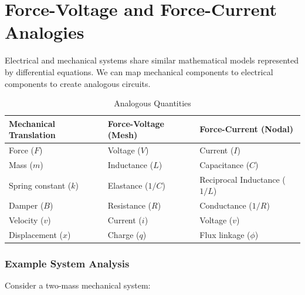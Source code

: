 \documentclass[12pt]{article}
\begin{document}
\section{Force-Voltage and Force-Current Analogies}
Electrical and mechanical systems share similar mathematical models represented by differential equations. We can map mechanical components to electrical components to create analogous circuits.

\begin{table}[h]
\centering
\begin{tabular}{@{}lll@{}}
\toprule
\textbf{Mechanical Translation} & \textbf{Force-Voltage (Mesh)} & \textbf{Force-Current (Nodal)} \\ \midrule
Force ($F$)                     & Voltage ($V$)                 & Current ($I$)                  \\
Mass ($m$)                      & Inductance ($L$)              & Capacitance ($C$)              \\
Spring constant ($k$)           & Elastance ($1/C$)             & Reciprocal Inductance ($1/L$)  \\
Damper ($B$)                    & Resistance ($R$)              & Conductance ($1/R$)            \\
Velocity ($v$)                  & Current ($i$)                 & Voltage ($v$)                  \\
Displacement ($x$)              & Charge ($q$)                  & Flux linkage ($\phi$)          \\ \bottomrule
\end{tabular}
\caption{Analogous Quantities }
\end{table}

\subsubsection*{Example System Analysis}
Consider a two-mass mechanical system:
\end{document}
